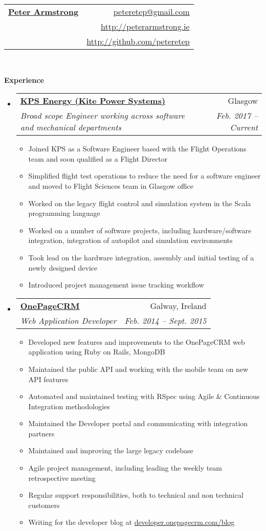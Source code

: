 \documentclass[letterpaper,11pt]{article}
\makeatletter
\newcommand{\resitem}[1]{\item #1 \vspace{-2pt}}
\newcommand{\resheading}[1]{{\large \colorbox{mygrey}{\begin{minipage}{\textwidth}{\textbf{#1 \vphantom{p\^{E}}}}\end{minipage}}}}
\newcommand{\ressubheading}[4]{
\begin{tabular*}{6.5in}{l@{\extracolsep{\fill}}r}
		\textbf{#1} & #2 \\
		\textit{#3} & \textit{#4} \\
\end{tabular*}\vspace{-6pt}}
\makeatother
\begin{document}
\newcommand{\mywebheader}{
\begin{tabular*}{7in}{l@{\extracolsep{\fill}}r}
	\textbf{\href{http://peterarmstrong.ie/}{\LARGE Peter Armstrong}} & \href{mailto:peteretep@gmail.com}{peteretep@gmail.com}\\
	& \href{http://peterarmstrong.ie}{http://peterarmstrong.ie} \\
	& \href{http://github.com/peteretep}{http://github.com/peteretep}
	\end{tabular*}
\\
\vspace{0.1in}}

\mywebheader

\resheading{Experience}
  

	\begin{itemize}
    \item 
      \ressubheading{\href{http://www.kps.energy}{KPS Energy (Kite Power Systems)}}{Glasgow}
        {Broad scope Engineer working across software and mechanical departments }{Feb. 2017 -- Current}
        {
        \begin{itemize}
          \resitem{Joined KPS as a Software Engineer based with the Flight Operations team and soon qualified as a Flight Director}
          \resitem{Simplified flight test operations to reduce the need for a software engineer and moved to Flight Sciences team in Glasgow office}
          \resitem{Worked on the legacy flight control and simulation system in the Scala programming language}
          \resitem{Worked on a number of software projects, including hardware/software integration, integration of autopilot and simulation environments}
          \resitem{Took lead on the hardware integration, assembly and initial testing of a newly designed device }
          \resitem{Introduced project management issue tracking workflow}
          \
          
        \end{itemize}
        }

	\item 
      \ressubheading{\href{http://www.onepagecrm.com}{OnePageCRM}}{Galway, Ireland}
        {Web Application Developer}{Feb. 2014 -- Sept. 2015}
        {
        \begin{itemize}
          \resitem{Developed new features and improvements to the OnePageCRM web application using Ruby on Rails, MongoDB}
          \resitem{Maintained the public API and working with the mobile team on new API features}
          \resitem{Automated and maintained testing with RSpec using Agile \& Continuous Integration methodologies}
          \resitem{Maintained the Developer portal and communicating with integration partners}
          \resitem{Maintained and improving the large legacy codebase}
          \resitem{Agile project management, including leading the weekly team retrospective meeting}
          \resitem{Regular support responsibilities, both to technical and non technical customers}
          \resitem{Writing for the developer blog at \href{http://developer.onepagecrm.com/blog}{developer.onepagecrm.com/blog}}
        \end{itemize}
        }


\end{itemize}
\end{document}
